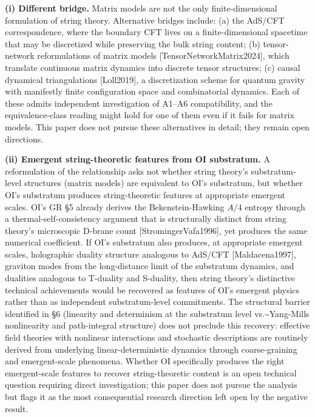 \documentclass[
]{article}
\begin{document}
\textbf{(i) Different bridge.} Matrix models are not the only
finite-dimensional formulation of string theory. Alternative bridges
include: (a) the AdS/CFT correspondence, where the boundary CFT lives on
a finite-dimensional spacetime that may be discretized while preserving
the bulk string content; (b) tensor-network reformulations of matrix
models {[}TensorNetworkMatrix2024{]}, which translate continuous matrix
dynamics into discrete tensor structures; (c) causal dynamical
triangulations {[}Loll2019{]}, a discretization scheme for quantum
gravity with manifestly finite configuration space and combinatorial
dynamics. Each of these admits independent investigation of A1--A6
compatibility, and the equivalence-class reading might hold for one of
them even if it fails for matrix models. This paper does not pursue
these alternatives in detail; they remain open directions.

\textbf{(ii) Emergent string-theoretic features from OI substratum.} A
reformulation of the relationship asks not whether string theory's
substratum-level structures (matrix models) are equivalent to OI's
substratum, but whether OI's substratum produces string-theoretic
features at appropriate emergent scales. OI's GR §5 already derives the
Bekenstein-Hawking \(A/4\) entropy through a thermal-self-consistency
argument that is structurally distinct from string theory's microscopic
D-brane count {[}StromingerVafa1996{]}, yet produces the same numerical
coefficient. If OI's substratum also produces, at appropriate emergent
scales, holographic duality structure analogous to AdS/CFT
{[}Maldacena1997{]}, graviton modes from the long-distance limit of the
substratum dynamics, and dualities analogous to T-duality and S-duality,
then string theory's distinctive technical achievements would be
recovered as features of OI's emergent physics rather than as
independent substratum-level commitments. The structural barrier
identified in §6 (linearity and determinism at the substratum level
vs.\textasciitilde Yang-Mills nonlinearity and path-integral structure)
does not preclude this recovery: effective field theories with nonlinear
interactions and stochastic descriptions are routinely derived from
underlying linear-deterministic dynamics through coarse-graining and
emergent-scale phenomena. Whether OI specifically produces the right
emergent-scale features to recover string-theoretic content is an open
technical question requiring direct investigation; this paper does not
pursue the analysis but flags it as the most consequential research
direction left open by the negative result.
\end{document}
